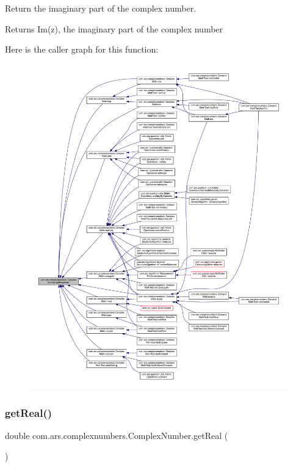 Return the imaginary part of the complex number. \begin{DoxyReturn}{Returns}
Im(z), the imaginary part of the complex number 
\end{DoxyReturn}
Here is the caller graph for this function\+:
\nopagebreak
\begin{figure}[H]
\begin{center}
\leavevmode
\includegraphics[width=350pt]{classcom_1_1ars_1_1complexnumbers_1_1_complex_number_a611fa4712cc691cf1e13e91f182c1850_icgraph}
\end{center}
\end{figure}
\hypertarget{classcom_1_1ars_1_1complexnumbers_1_1_complex_number_a4cb4de35836a0ca818d3f2ce2df07736}{}\label{classcom_1_1ars_1_1complexnumbers_1_1_complex_number_a4cb4de35836a0ca818d3f2ce2df07736} 
\subsubsection{\texorpdfstring{get\+Real()}{getReal()}}
{\footnotesize\ttfamily double com.\+ars.\+complexnumbers.\+Complex\+Number.\+get\+Real (\begin{DoxyParamCaption}{ }\end{DoxyParamCaption})}

